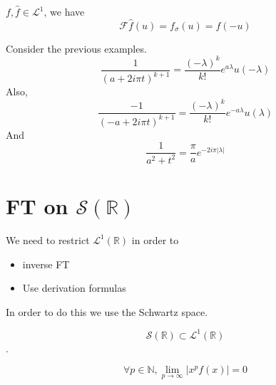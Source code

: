 \begin{cor}[]
    $ f, \widehat{f} \in \mathscr{L}^1  $, we have 
    \[
        \mathscr{ F } \widehat{f}\left( u\right) = f _{ \sigma  }^{  } (u) = f(-u) 
    \]
\end{cor}

\begin{exmp}[]
    Consider the previous examples. 
    \[
        \frac{ 1 }{ \left( a + 2i\pi t \right) ^{k+1}  } = \frac{ \left( -\lambda\right)
        ^k  }{ k! } e^{ a\lambda } u\left( -\lambda \right) 
    \]
    Also, 
    \[
        \frac{ -1 }{ \left( -a + 2i\pi t \right) ^{k+1}  } = \frac{ \left( -\lambda\right)
        ^k }{ k!  }e^{-a\lambda} u(\lambda)
    \]
    And 
    \[
    \frac{ 1 }{ a^2 + t^2  } = \frac{ \pi }{ a } e^{ -2i\pi \left | \lambda  \right | } 
    \]
\end{exmp}



\section{FT on $ \mathscr{ S } \left( \mathbb{R}\right)  $ }
\label{sec:FT on $ \mathscr{ S } \left( \mathbb{R}\right)  $ }
We need to restrict $ \mathscr{L}^1\left( \mathbb{R}\right)   $ in order to 
\begin{itemize}
  \item inverse FT
  \item Use derivation formulas 
\end{itemize}
In order to do this we use the Schwartz space. 
\begin{exmp}
    \[
    \mathscr{ S } \left( \mathbb{R}\right) \subset \mathscr{L}^1\left( \mathbb{R}\right)  
    \]. 
\end{exmp}

\begin{defn}
    \[
        \forall p \in \mathbb{N}, \lim_{p \to \infty} \left | x^p f(x)  \right | = 0
    \]
    \label{def:Rapidly Decreasing Functions}
\end{defn}

